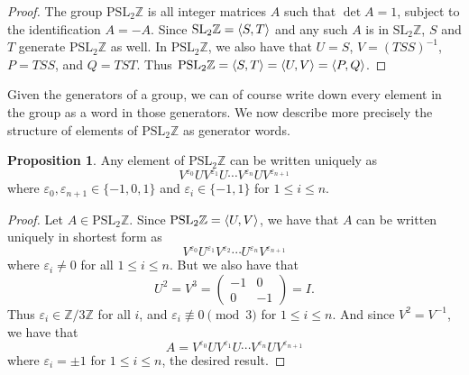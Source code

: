 \documentclass[12pt,twoside]{reedthesis}
\theoremstyle{definition}
\newtheorem{prop}[thm]{Proposition}
\newcommand{\Z}{\mathbb{Z}}
\newcommand{\SLZ}{\mathrm{SL}_2{\Z}}
\newcommand{\PSLZ}{\mathrm{PSL}_2{\Z}}
\DeclarePairedDelimiter\ang{\langle}{\rangle}
\begin{document}
\begin{proof}
  The group $\PSLZ$ is all integer matrices $A$ such that $\det A = 1$, subject to the identification $A = -A$.
  Since $\SLZ = \ang{S,T}$ and any such $A$ is in $\SLZ$, $S$ and $T$ generate $\PSLZ$ as well.
  In $\PSLZ$, we also have that $U = S$, $V = (TSS)^{-1}$, $P = TSS$, and $Q = TST$.
  Thus $\PSLZ = \ang{S,T} = \ang{U,V} = \ang{P,Q}$.
\end{proof}

Given the generators of a group, we can of course write down every element in the group as a word in those generators. We now describe more precisely the structure of elements of $\PSLZ$ as generator words.

\begin{prop}\label{prop:reducedform}
  Any element of $\PSLZ$ can be written uniquely as
  \begin{equation}
    V^{\varepsilon_0} U V^{\varepsilon_1} U \cdots V^{\varepsilon_{n}} U V^{\varepsilon_{n+1}}
  \end{equation}
  where $\varepsilon_0, \varepsilon_{n+1} \in \{-1,0,1\}$ and $\varepsilon_i \in \{-1,1\}$ for $1 \leq i \leq n$.
\end{prop}

\begin{proof}
  Let $A \in \PSLZ$.
  Since $\PSLZ = \ang{U,V}$, we have that $A$ can be written uniquely in shortest form as
  \begin{equation*}
    V^{\varepsilon_0} U^{\varepsilon_1} V^{\varepsilon_2} \cdots U^{\varepsilon_{n}} V^{\varepsilon_{n+1}}
  \end{equation*}
  where $\varepsilon_i \neq 0$ for all $ 1 \leq i \leq n$.
  But we also have that
  \begin{equation*}
    U^2 = V^3 = \begin{pmatrix}
      -1 & 0 \\
      0 & -1
    \end{pmatrix}
    = I.
  \end{equation*}
  Thus $\varepsilon_i \in \Z / 3 \Z$ for all $i$, and $\varepsilon_i \not\equiv 0 \pmod 3$ for $1 \leq i \leq n$.
  And since $V^2 = V^{-1}$, we have that
  \begin{equation*}
    A = V^{\varepsilon_0} U V^{\varepsilon_1} U \cdots V^{\varepsilon_n} U V^{\varepsilon_{n+1}}
  \end{equation*}
  where $\varepsilon_i = \pm 1$ for $1 \leq i \leq n$, the desired result.
\end{proof}
\end{document}
